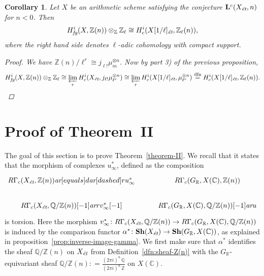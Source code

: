 \documentclass[draft,leqno,12pt]{article}
\theoremstyle{plain}
\newtheorem{corollary}[theorem]{\indent\sc Corollary}
\theoremstyle{definition}
\newcommand{\ZZ}{\mathbb{Z}}
\newcommand{\QQ}{\mathbb{Q}}
\newcommand{\RR}{\mathbb{R}}
\newcommand{\CC}{\mathbb{C}}
\newcommand{\dfn}{\mathrel{\mathop:}=}
\newcommand{\et}{\text{\it \'{e}t}}
\newcommand{\fg}{\text{\it fg}}
\newcommand{\ar}{\text{\it ar}}
\begin{document}
\begin{corollary}
  \label{cor:RGamma-fg-model-for-l-adic-cohomology}
  Let $X$ be an arithmetic scheme satisfying the conjecture
  $\mathbf{L}^c (X_\et, n)$ for $n < 0$. Then
  $$H_\fg^i (X, \ZZ (n)) \otimes_\ZZ \ZZ_\ell \cong H^i_c (X [1/\ell]_\et, \ZZ_\ell (n)),$$
  where the right hand side denotes $\ell$-adic cohomology with compact support.

  \begin{proof}
    We have $\ZZ (n)/\ell^r \cong j_{\ell!} \mu_m^{\otimes n}$.
    Now by part 3) of the previous proposition,
    \[ H_\fg^i (X, \ZZ (n)) \otimes_\ZZ \ZZ_\ell \cong
      \varprojlim_r H_c^i (X_\et, j_{\ell!} \mu_{\ell^r}^{\otimes n}) \cong
      \varprojlim_r H_c^i (X [1/\ell]_\et, \mu_{\ell^r}^{\otimes n})
      \stackrel{\text{dfn}}{=} H_c^i (X [1/\ell]_\et, \ZZ_\ell (n)). \qedhere \]
  \end{proof}
\end{corollary}


\section{Proof of Theorem~II}
\label{sec:theorem-II}

The goal of this section is to prove Theorem~\ref{theorem-II}. We recall that it
states that the morphism of complexes $u_\infty^*$, defined as the composition
\[ \begin{tikzcd}
  R\Gamma_c (X_\et, \ZZ(n)) \ar[equals]{d}\ar[dashed]{r}{u_\infty^*} & R\Gamma_c (G_\RR, X (\CC), \ZZ (n)) \\
  R\Gamma_c (X_\et, \QQ/\ZZ (n)) [-1] \ar{r}{v_\infty^* [-1]} & R\Gamma_c (G_\RR, X (\CC), \QQ/\ZZ (n)) [-1] \ar{u}
\end{tikzcd} \]
is torsion. Here the morphism
$v_\infty^*\colon R\Gamma_c (X_\et, \QQ/\ZZ (n)) \to R\Gamma_c (G_\RR, X (\CC), \QQ/\ZZ (n))$
is induced by the comparison functor
$\alpha^*\colon \mathbf{Sh} (X_\et) \to \mathbf{Sh} (G_\RR, X (\CC))$, as
explained in proposition~\ref{prop:inverse-image-gamma}. We first make sure that
$\alpha^*$ identifies the sheaf $\QQ/\ZZ (n)$ on $X_\et$ from
Definition~\ref{dfn:sheaf-Z(n)} with the $G_\RR$-equivariant sheaf
$\QQ/\ZZ (n) \dfn \frac{(2\pi i)^n\,\QQ}{(2\pi i)^n\,\ZZ}$ on $X (\CC)$.
\end{document}
